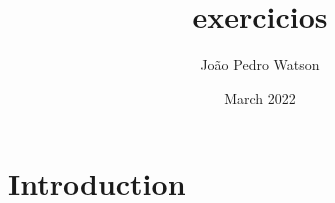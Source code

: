 \documentclass{article}[12pt, A4]
\title{exercicios}
\author{João Pedro Watson}
\date{March 2022}
\begin{document}
\maketitle

\section{Introduction}
\end{document}
